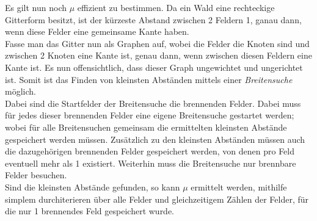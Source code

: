 Es gilt nun noch $\mu$ effizient zu bestimmen. Da ein Wald eine rechteckige Gitterform besitzt, ist der kürzeste Abstand zwischen 2 Feldern 1, ganau dann, wenn diese Felder eine gemeinsame Kante haben.\\
Fasse man das Gitter nun als Graphen auf, wobei die Felder die Knoten sind und zwischen 2 Knoten eine Kante ist, genau dann, wenn zwischen diesen Feldern eine Kante ist. Es nun offensichtlich, dass dieser Graph ungewichtet und ungerichtet  ist. Somit ist das Finden von kleinsten Abständen mittels einer \emph{Breitensuche} möglich.\\
Dabei sind die Startfelder der Breitensuche die brennenden Felder. Dabei muss für jedes dieser brennenden Felder eine eigene Breitensuche gestartet werden; wobei für alle Breitensuchen gemeinsam die ermittelten kleinsten Abstände gespeichert werden müssen. Zusätzlich zu den kleinsten Abständen müssen auch die dazugehörigen brennenden Felder gespeichert werden, von denen pro Feld eventuell mehr als 1 existiert. Weiterhin muss die Breitensuche nur brennbare Felder besuchen.\\
Sind die kleinsten Abstände gefunden, so kann $\mu$ ermittelt werden, mithilfe simplem durchiterieren über alle Felder und gleichzeitigem Zählen der Felder, für die nur 1 brennendes Feld gespeichert wurde.

